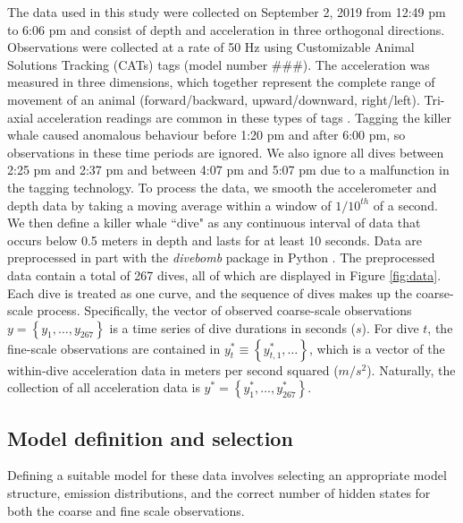 The data used in this study were collected on September 2, 2019 from 12:49 pm to 6:06 pm and consist of depth and acceleration in three orthogonal directions. Observations were collected at a rate of 50 Hz using Customizable Animal Solutions Tracking (CATs) tags (model number \#\#\#). The acceleration was measured in three dimensions, which together represent the complete range of movement of an animal (forward/backward, upward/downward, right/left). Tri-axial acceleration readings are common in these types of tags \citep{Cade:2017,Fehlmann:2017,Wright:2017}. Tagging the killer whale caused anomalous behaviour before 1:20 pm and after 6:00 pm, so observations in these time periods are ignored. We also ignore all dives between 2:25 pm and 2:37 pm and between 4:07 pm and 5:07 pm due to a malfunction in the tagging technology. To process the data, we smooth the accelerometer and depth data by taking a moving average within a window of $1/10^{th}$ of a second. We then define a killer whale ``dive" as any continuous interval of data that occurs below 0.5 meters in depth and lasts for at least 10 seconds. Data are preprocessed in part with the \textit{divebomb} package in Python \citep{Nunes:2018}. The preprocessed data contain a total of 267 dives, all of which are displayed in Figure \ref{fig:data}. Each dive is treated as one curve, and the sequence of dives makes up the coarse-scale process. Specifically, the vector of observed coarse-scale observations $y = \left\{y_1,\ldots,y_{267}\right\}$ is a time series of dive durations in seconds ($s$). For dive $t$, the fine-scale observations are contained in $y^*_{t} \equiv \left\{y^*_{t,1},\ldots \right\}$, which is a vector of the within-dive acceleration data in meters per second squared ($m/s^2$). Naturally, the collection of all acceleration data is $y^* = \left\{y^*_1,\ldots,y^*_{267}\right\}$.

\subsection{Model definition and selection}

Defining a suitable model for these data involves selecting an appropriate model structure, emission distributions, and the correct number of hidden states for both the coarse and fine scale observations.

